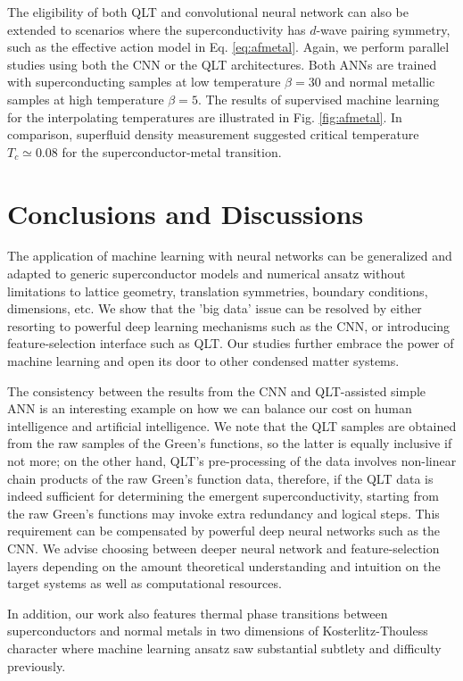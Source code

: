 \documentclass[amsmath,amssymb, aps, prl, twocolumn]{revtex4-1}
\begin{document}
The eligibility of both QLT and convolutional neural network can also be extended to scenarios where the superconductivity has $d$-wave pairing symmetry, such as the effective action model in Eq. \ref{eq:afmetal}. Again, we perform parallel studies using both the CNN or the QLT architectures. Both ANNs are trained with superconducting samples at low temperature $\beta=30$ and normal metallic samples at high temperature $\beta=5$. The results of supervised machine learning for the interpolating temperatures are illustrated in Fig. \ref{fig:afmetal}. In comparison, superfluid density measurement suggested critical temperature $T_c\simeq 0.08$ for the superconductor-metal transition\cite{Erez2016}.


\section{Conclusions and Discussions} The application of machine learning with neural networks can be generalized and adapted to generic superconductor models and numerical ansatz without limitations to lattice geometry, translation symmetries, boundary conditions, dimensions, etc. We show that the 'big data' issue can be resolved by either resorting to powerful deep learning mechanisms such as the CNN, or introducing feature-selection interface such as QLT. Our studies further embrace the power of machine learning and open its door to other condensed matter systems.

The consistency between the results from the CNN and QLT-assisted simple ANN is an interesting example on how we can balance our cost on human intelligence and artificial intelligence. We note that the QLT samples are obtained from the raw samples of the Green's functions, so the latter is equally inclusive if not more; on the other hand, QLT's pre-processing of the data involves non-linear chain products of the raw Green's function data, therefore, if the QLT data is indeed sufficient for determining the emergent superconductivity, starting from the raw Green's functions may invoke extra redundancy and logical steps. This requirement can be compensated by powerful deep neural networks such as the CNN. We advise choosing between deeper neural network and feature-selection layers depending on the amount theoretical understanding and intuition on the target systems as well as computational resources. 

In addition, our work also features thermal phase transitions between superconductors and normal metals in two dimensions of Kosterlitz-Thouless character where machine learning ansatz saw substantial subtlety and difficulty previously\cite{Anna2018}. 
\end{document}
